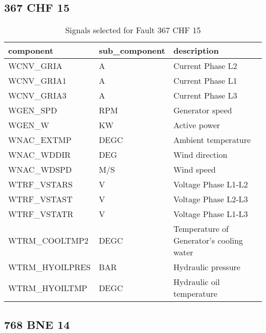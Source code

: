 \subsection{367 CHF 15}

\begin{table}[!ht]
    \centering
    \begin{tabular}{|l|l|l|}
    \hline
        component & sub\_component & description \\ \hline
        WCNV\_GRIA & A & Current Phase L2 \\ \hline
        WCNV\_GRIA1 & A & Current Phase L1 \\ \hline
        WCNV\_GRIA3 & A & Current Phase L3 \\ \hline
        WGEN\_SPD & RPM & Generator speed \\ \hline
        WGEN\_W & KW & Active power \\ \hline
        WNAC\_EXTMP & DEGC & Ambient temperature \\ \hline
        WNAC\_WDDIR & DEG & Wind direction \\ \hline
        WNAC\_WDSPD & M/S & Wind speed \\ \hline
        WTRF\_VSTARS & V & Voltage Phase L1-L2 \\ \hline
        WTRF\_VSTAST & V & Voltage Phase L2-L3 \\ \hline
        WTRF\_VSTATR & V & Voltage Phase L1-L3 \\ \hline
        WTRM\_COOLTMP2 & DEGC & Temperature of Generator's cooling water \\ \hline
        WTRM\_HYOILPRES & BAR & Hydraulic pressure \\ \hline
        WTRM\_HYOILTMP & DEGC & Hydraulic oil temperature \\ \hline
    \end{tabular}
    \caption{Signals selected for Fault 367 CHF 15}
\end{table}

\subsection{768 BNE 14}

